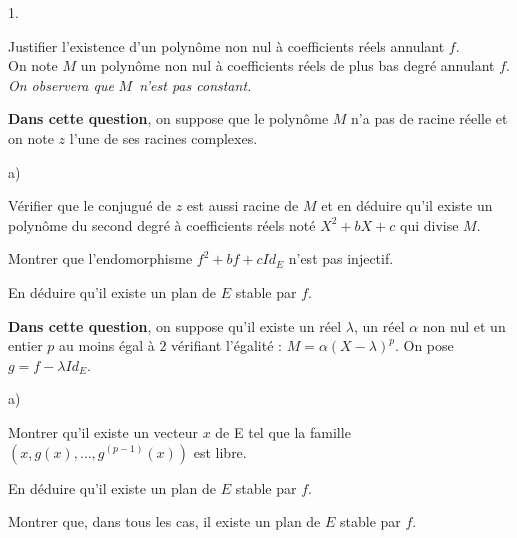\documentclass[11pt]{article}%
\begin{document}
\begin{noliste}{1.}
 \setlength{\itemsep}{4mm}
\item Justifier l'existence d'un polynôme non nul à coefficients réels
annulant $f$.\\
On note $M$ un polynôme non nul à coefficients réels de plus bas degré
annulant $f$. \textit{On observera que }$M$\textit{\ n'est pas
constant. }

\item \textbf{Dans cette question}, on suppose que le polynôme $M$ n'a
pas
de racine réelle et on note $z$ l'une de ses racines complexes.

\begin{noliste}{a)}
 \setlength{\itemsep}{2mm}
\item Vérifier que le conjugué de $z$ est aussi racine de $M$ et en
déduire
qu'il existe un polynôme du second degré à coefficients réels noté
$X^{2} + bX + c$ qui divise $M$.

\item Montrer que l'endomorphisme $f^{2} + bf + cId_{E}$ n'est pas
injectif.

\item En déduire qu'il existe un plan de $E$ stable par $f$.
\end{noliste}

\item \textbf{Dans cette question}, on suppose qu'il existe un réel
$\lambda 
$, un réel $\alpha $ non nul et un entier $p$ au moins égal à $2$
vérifiant
l'égalité : $M = \alpha (X-\lambda )^{p}$. On pose $g = f-\lambda
Id_{E}$.

\begin{noliste}{a)}
 \setlength{\itemsep}{2mm}
\item Montrer qu'il existe un vecteur $x$ de E tel que la famille
$(x,g(x),\dots,g^{(p-1)}(x))$ est libre.

\item En déduire qu'il existe un plan de $E$ stable par $f$.
\end{noliste}

\item Montrer que, dans tous les cas, il existe un plan de $E$ stable
par $f$.
\end{noliste}

\label{fin}
\end{document}
